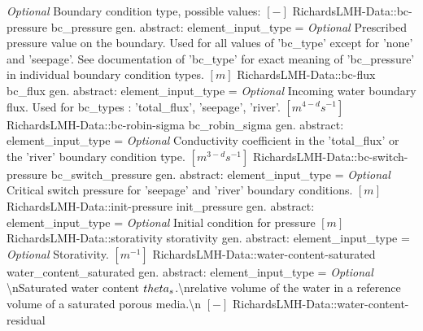 \begin{RecordType}
			{ \it{Optional}}
			{{{Boundary condition type, possible values: }{$[-]$}%
}}
		\RecKey
			{RichardsLMH-Data::bc-pressure}
			{bc{\_}pressure}
			{{gen. abstract: }}{{element{\_}input{\_}type}{ = }}
			{ \it{Optional}}
			{{{Prescribed pressure value on the boundary.
Used for all values of 'bc{\_}type' except for 'none' and 'seepage'. See documentation of 'bc{\_}type' for exact meaning of 'bc{\_}pressure' in individual boundary condition types. }{$[m]$}%
}}
		\RecKey
			{RichardsLMH-Data::bc-flux}
			{bc{\_}flux}
			{{gen. abstract: }}{{element{\_}input{\_}type}{ = }}
			{ \it{Optional}}
			{{{Incoming water boundary flux.
Used for bc{\_}types : 'total{\_}flux', 'seepage', 'river'. }{$[m^{4-d}s^{-1}]$}%
}}
		\RecKey
			{RichardsLMH-Data::bc-robin-sigma}
			{bc{\_}robin{\_}sigma}
			{{gen. abstract: }}{{element{\_}input{\_}type}{ = }}
			{ \it{Optional}}
			{{{Conductivity coefficient in the 'total{\_}flux' or the 'river' boundary condition type. }{$[m^{3-d}s^{-1}]$}%
}}
		\RecKey
			{RichardsLMH-Data::bc-switch-pressure}
			{bc{\_}switch{\_}pressure}
			{{gen. abstract: }}{{element{\_}input{\_}type}{ = }}
			{ \it{Optional}}
			{{{Critical switch pressure for 'seepage' and 'river' boundary conditions. }{$[m]$}%
}}
		\RecKey
			{RichardsLMH-Data::init-pressure}
			{init{\_}pressure}
			{{gen. abstract: }}{{element{\_}input{\_}type}{ = }}
			{ \it{Optional}}
			{{{Initial condition for pressure }{$[m]$}%
}}
		\RecKey
			{RichardsLMH-Data::storativity}
			{storativity}
			{{gen. abstract: }}{{element{\_}input{\_}type}{ = }}
			{ \it{Optional}}
			{{{Storativity. }{$[m^{-1}]$}%
}}
		\RecKey
			{RichardsLMH-Data::water-content-saturated}
			{water{\_}content{\_}saturated}
			{{gen. abstract: }}{{element{\_}input{\_}type}{ = }}
			{ \it{Optional}}
			{{{{\textbackslash}nSaturated water content }{$ \\theta_s $}{.{\textbackslash}nrelative volume of the water in a reference volume of a saturated porous media.{\textbackslash}n }{$[-]$}%
}}
		\RecKey
			{RichardsLMH-Data::water-content-residual}

\end{RecordType}
